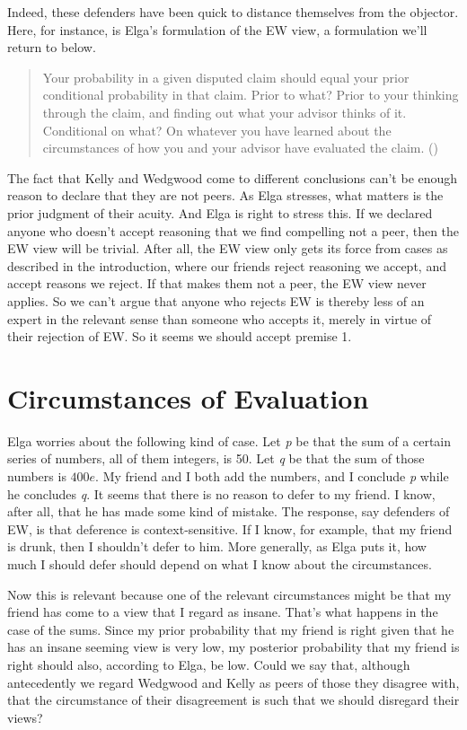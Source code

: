 \documentclass[
  11pt,
  letterpaper,
  DIV=11,
  numbers=noendperiod,
  twoside]{scrartcl}
\begin{document}
Indeed, these defenders have been quick to distance themselves from the
objector. Here, for instance, is Elga's formulation of the EW view, a
formulation we'll return to below.

\begin{quote}
Your probability in a given disputed claim should equal your prior
conditional probability in that claim. Prior to what? Prior to your
thinking through the claim, and finding out what your advisor thinks of
it. Conditional on what? On whatever you have learned about the
circumstances of how you and your advisor have evaluated the claim.
()
\end{quote}

The fact that Kelly and Wedgwood come to different conclusions can't be
enough reason to declare that they are not peers. As Elga stresses, what
matters is the prior judgment of their acuity. And Elga is right to
stress this. If we declared anyone who doesn't accept reasoning that we
find compelling not a peer, then the EW view will be trivial. After all,
the EW view only gets its force from cases as described in the
introduction, where our friends reject reasoning we accept, and accept
reasons we reject. If that makes them not a peer, the EW view never
applies. So we can't argue that anyone who rejects EW is thereby less of
an expert in the relevant sense than someone who accepts it, merely in
virtue of their rejection of EW. So it seems we should accept premise 1.

\section{Circumstances of Evaluation}\label{circumstances-of-evaluation}

Elga worries about the following kind of case. Let \emph{p} be that the
sum of a certain series of numbers, all of them integers, is 50. Let
\emph{q} be that the sum of those numbers is \(400e\). My friend and I
both add the numbers, and I conclude \emph{p} while he concludes
\emph{q}. It seems that there is no reason to defer to my friend. I
know, after all, that he has made some kind of mistake. The response,
say defenders of EW, is that deference is context-sensitive. If I know,
for example, that my friend is drunk, then I shouldn't defer to him.
More generally, as Elga puts it, how much I should defer should depend
on what I know about the circumstances.

Now this is relevant because one of the relevant circumstances might be
that my friend has come to a view that I regard as insane. That's what
happens in the case of the sums. Since my prior probability that my
friend is right given that he has an insane seeming view is very low, my
posterior probability that my friend is right should also, according to
Elga, be low. Could we say that, although antecedently we regard
Wedgwood and Kelly as peers of those they disagree with, that the
circumstance of their disagreement is such that we should disregard
their views?
\end{document}
